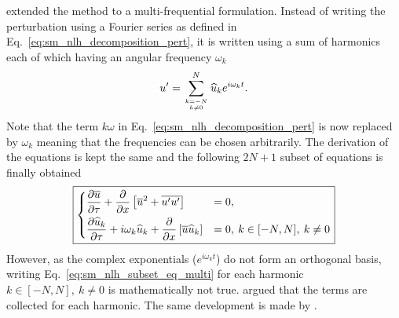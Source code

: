 \citet{He2002} extended the method to a multi-frequential
formulation. Instead of writing the perturbation
using a Fourier series as defined in Eq.~\eqref{eq:sm_nlh_decomposition_pert},
it is written using a sum of harmonics each of which
having an angular frequency $\omega_k$
\begin{equation}
	u^\prime = \sum_{\genfrac{}{}{0pt}{}{k=-N}{k \neq 0}}^{N} 
	\widehat{u}_k e^{i \omega_k t}.
	\label{eq:sm_nlh_decomposition_pert_multi}
\end{equation}
Note that the term $k \omega$ in Eq.~\eqref{eq:sm_nlh_decomposition_pert}
is now replaced by $\omega_k$ meaning that the frequencies can be chosen
arbitrarily.
The derivation of the equations is kept the same and the following
$2N+1$ subset of equations is finally obtained
\begin{equation}
	\fbox{$
	\begin{dcases}
		\frac{\partial \overline{u}}{\partial \tau} +
		\frac{\partial}{\partial x}
			\left[\overline{u}^2 + 
			\overline{u^\prime u^\prime}\right] &=
			0, \\
		\frac{\partial \widehat{u}_k}{\partial \tau} + 
		i \omega_k \widehat{u}_k + 
			\frac{\partial}{\partial x} 
			\left[ \overline{u} \widehat{u}_k\right] &= 
			0, \: k \in [-N, N], \: k \neq 0
	\end{dcases}
	$}
	\label{eq:sm_nlh_subset_eq_multi}
\end{equation}
However, as the complex exponentials 
($e^{i \omega_k t}$) do not form
an orthogonal basis, writing Eq.~\eqref{eq:sm_nlh_subset_eq_multi}
for each harmonic $k \in [-N, N], \: k \neq 0$ is mathematically
not true. \citet{He2002} argued that the terms
are collected for each harmonic. 
The same development is made by \citet{Vilmin2006}.

